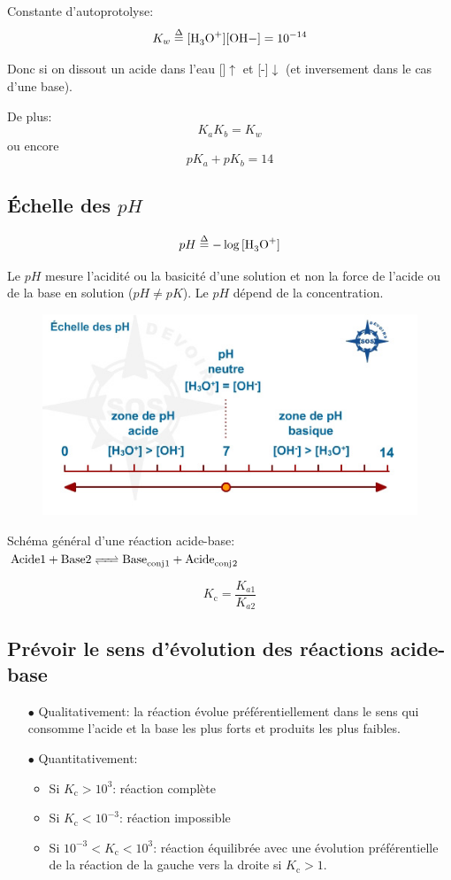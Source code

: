 \documentclass[11pt,a4paper,french]{article}
\newcommand\kc{\ensuremath{K_{\mathrm{c}}}}
\newcommand\eqdef{\stackrel{\Delta}{=}}
\newcommand\ph{\ensuremath{pH}}
\begin{document}
Constante d'autoprotolyse:
\[ K_w\eqdef[\ce{H3O+}][\ce{OH}-]=10^{-14} \]

Donc si on dissout un acide dans l'eau []$\uparrow$ et [-]$\downarrow$ (et inversement dans le cas d'une base).

De plus: 
\[ K_aK_b=K_w \]
ou encore
\[ pK_a+pK_b=14 \]

\subsection{\'Echelle des $\ph$}

$$\ph\eqdef-\log{[\ce{H3O+}]}$$

Le $\ph$ mesure l'acidité ou la basicité d'une solution et non la force de l'acide ou de la base en solution ($\ph \neq pK$).
Le $\ph$ dépend de la concentration.
\begin{figure}[ht!]
	\centering
	\includegraphics[scale=0.5]{echelle_ph.jpg}
\end{figure}

Schéma général d'une réaction acide-base:
$\ce{Acide 1 + Base 2 <=> Base_{conj}1 + Acide_{conj}2}$

$$\kc=\frac{K_{a1}}{K_{a2}}$$

\subsection{Prévoir le sens d'évolution des réactions acide-base}

\begin{itemize}
\item[$\bullet$] Qualitativement: la réaction évolue préférentiellement dans le sens qui consomme l'acide et la base les plus forts et produits les plus faibles.
\item[$\bullet$] Quantitativement:
	\begin{itemize}
	\item Si $\kc>10^3$: réaction complète
	\item Si $\kc<10^{-3}$: réaction impossible
	\item Si $10^{-3}<\kc<10^3$: réaction équilibrée avec une évolution préférentielle de la réaction de la gauche vers la droite si $\kc>1$.
	\end{itemize}
\end{itemize}
\end{document}
